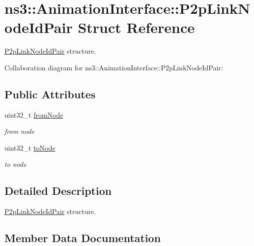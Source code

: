 \hypertarget{structns3_1_1AnimationInterface_1_1P2pLinkNodeIdPair}{}\section{ns3\+:\+:Animation\+Interface\+:\+:P2p\+Link\+Node\+Id\+Pair Struct Reference}
\label{structns3_1_1AnimationInterface_1_1P2pLinkNodeIdPair}


\hyperlink{structns3_1_1AnimationInterface_1_1P2pLinkNodeIdPair}{P2p\+Link\+Node\+Id\+Pair} structure.  




Collaboration diagram for ns3\+:\+:Animation\+Interface\+:\+:P2p\+Link\+Node\+Id\+Pair\+:
\subsection*{Public Attributes}
\begin{DoxyCompactItemize}
\item 
uint32\+\_\+t \hyperlink{structns3_1_1AnimationInterface_1_1P2pLinkNodeIdPair_af0a05bb0c884bb5cab25da804af4dc33}{from\+Node}
\begin{DoxyCompactList}\small\item\em from node \end{DoxyCompactList}\item 
uint32\+\_\+t \hyperlink{structns3_1_1AnimationInterface_1_1P2pLinkNodeIdPair_abe203e56cfe85b60432c89fa20ec8945}{to\+Node}
\begin{DoxyCompactList}\small\item\em to node \end{DoxyCompactList}\end{DoxyCompactItemize}


\subsection{Detailed Description}
\hyperlink{structns3_1_1AnimationInterface_1_1P2pLinkNodeIdPair}{P2p\+Link\+Node\+Id\+Pair} structure. 

\subsection{Member Data Documentation}
